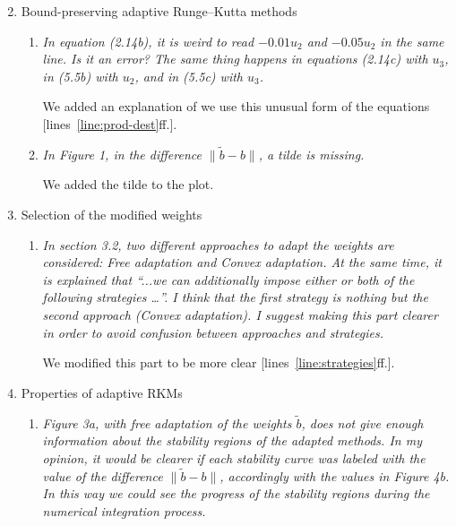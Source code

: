 \documentclass[11pt]{letter}
\begin{document}
\begin{letter}{}
\begin{enumerate}[label=\arabic*.]
  \setcounter{enumi}{1}
  \item Bound-preserving adaptive Runge–Kutta methods
  \begin{enumerate}[label=\alph*)]
    \item \emph{%
    In equation (2.14b), it is weird to read $-0.01 u_2$ and $- 0.05 u_2$
    in the same line. Is it an error? The same thing happens in equations (2.14c)
    with $u_3$, in (5.5b) with $u_2$, and in (5.5c) with $u_3$.
    }

    We added an explanation of we use this unusual form of the
    equations [lines~\ref{line:prod-dest}ff.].


    \item \emph{%
    In Figure 1, in the difference $\| \tilde b - b \|$, a tilde is missing.
    }

    We added the tilde to the plot.
  \end{enumerate}


  \item Selection of the modified weights
  \begin{enumerate}[label=\alph*)]
    \item \emph{%
    In section 3.2, two different approaches to adapt the weights are considered:
    Free adaptation and Convex adaptation. At the same time, it is explained that
    ``...we can additionally impose either or both of the following strategies \dots''.
    I think that the first strategy is nothing but the second approach (Convex
    adaptation). I suggest making this part clearer in order to avoid confusion
    between approaches and strategies.
    }

    We modified this part to be more clear [lines~\ref{line:strategies}ff.].
  \end{enumerate}


  \item Properties of adaptive RKMs
  \begin{enumerate}[label=\alph*)]
    \item \emph{%
    Figure 3a, with free adaptation of the weights $\tilde b$, does not give enough
    information about the stability regions of the adapted methods. In my opinion,
    it would be clearer if each stability curve was labeled with the value of
    the difference $\| \tilde b - b \|$, accordingly with the values in Figure 4b.
    In this way we could see the progress of the stability regions during the
    numerical integration process.
    }


\end{enumerate}
\end{enumerate}
\end{letter}
\end{document}
